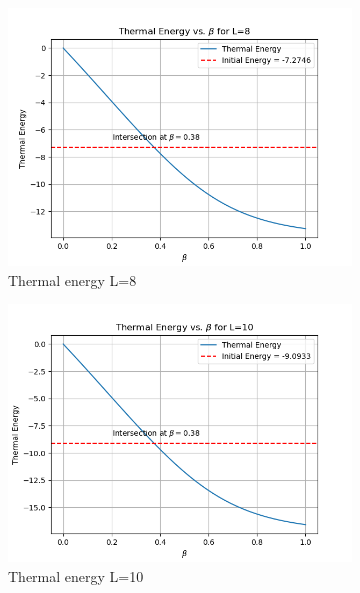 \documentclass[12pt]{article}
\begin{document}
\begin{figure}[htbp]
    \centering
    \begin{subfigure}[b]{0.32\textwidth}
        \includegraphics[width=\textwidth]{p4_1_2_thermal_energy_L8.png}
        \caption{Thermal energy L=8}
    \end{subfigure}
    \begin{subfigure}[b]{0.32\textwidth}
        \includegraphics[width=\textwidth]{p4_1_2_thermal_energy_L10.png}
        \caption{Thermal energy L=10}
    \end{subfigure}
    \begin{subfigure}[b]{0.32\textwidth}

\end{subfigure}
\end{figure}
\end{document}
